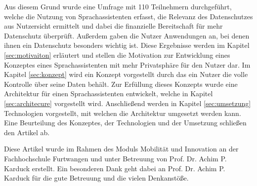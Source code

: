 Aus diesem Grund wurde eine Umfrage mit 110 Teilnehmern durchgeführt, welche die Nutzung von Sprachassistenten erfasst, die Relevanz des Datenschutzes aus Nutzersicht ermittelt und dabei die finanzielle Bereitschaft für mehr Datenschutz überprüft. Außerdem gaben die Nutzer Anwendungen an, bei denen ihnen ein Datenschutz besonders wichtig ist. Diese Ergebnisse werden im Kapitel \ref{sec:motivaiton} erläutert und stellen die Motivation zur Entwicklung eines Konzeptes eines Sprachassistenten mit mehr Privatsphäre für den Nutzer dar. Im Kapitel \ref{sec:konzept} wird ein Konzept vorgestellt durch das ein Nutzer die volle Kontrolle über seine Daten behält. Zur Erfüllung dieses Konzepts wurde eine Architektur für einen Sprachassistenten entwickelt, welche in Kapitel \ref{sec:architecure} vorgestellt wird. Anschließend werden in Kapitel \ref{sec:umsetzung} Technologien vorgestellt, mit welchen die Architektur umgesetzt werden kann. Eine Beurteilung des Konzeptes, der Technologien und der Umsetzung schließen den Artikel ab. \newline

Diese Artikel wurde im Rahmen des Moduls \glqq Mobilität und Innovation\grqq{} an der Fachhochschule Furtwangen und unter Betreuung von Prof. Dr. Achim P. Karduck erstellt. Ein besonderen Dank geht dabei an Prof. Dr. Achim P. Karduck für die gute Betreuung und die vielen Denkanstöße.
